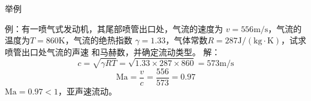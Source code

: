 \begin{frame}{举例}
  \begin{block}{例：有一喷气式发动机，其尾部喷管出口处，气流的速度为
    $v=556\mathrm{m/s}$，气流的温度为$T=860\mathrm{K}$，气流的绝热指数
  $\gamma=1.33$，气体常数$R=287\mathrm{J/(kg\cdot K)}$，试求喷管出口处气流的声速
和马赫数，并确定流动类型。}
解：
   \begin{equation*}
   c
   =
   \sqrt{\gamma RT}
   =
   \sqrt{1.33\times 287 \times 860}
   =
   573\mathrm{m/s}
   \end{equation*} 
   \begin{equation*}
     \mathrm{Ma}
     =
     \frac{v}{c}
     =
     \frac{556}{573}
     =
     0.97 
   \end{equation*}
   $\mathrm{Ma}=0.97<1$，亚声速流动。
  \end{block}
\end{frame}
